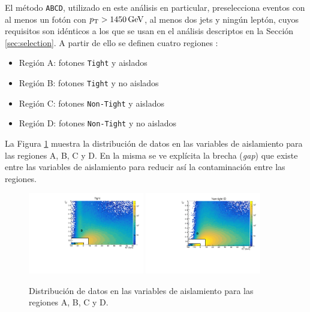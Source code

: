 El método \texttt{ABCD}, utilizado en este análisis en particular, preselecciona eventos con al menos un fotón con $p_{\text{T}}>1450\,\text{GeV}$, al menos dos jets y ningún leptón, cuyos requisitos son idénticos a los que se usan en el análisis descriptos en la Sección \ref{sec:selection}. A partir de ello se definen cuatro regiones \cite{ATL-COM-PHYS-2016-1626}:

\begin{itemize}
  \item Región A: fotones \texttt{Tight} y aislados
  \item Región B: fotones \texttt{Tight} y no aislados
  \item Región C: fotones \texttt{Non-Tight} y aislados
  \item Región D: fotones \texttt{Non-Tight} y no aislados
\end{itemize}

La Figura \ref{fig:abcd_regions} muestra la distribución de datos en las variables de aislamiento para las regiones A, B, C y D. En la misma se ve explícita la brecha (\textit{gap}) que existe entre las variables de aislamiento para reducir así la contaminación entre las regiones.

\begin{figure}
  \centering
  \includegraphics[width=0.45\textwidth]{images/analysis/tight_ABCD_data.pdf}
  \includegraphics[width=0.45\textwidth]{images/analysis/nontight_ABCD_data.pdf}
  \caption{Distribución de datos en las variables de aislamiento para las regiones A, B, C y D.}
  \label{fig:abcd_regions}
\end{figure}


